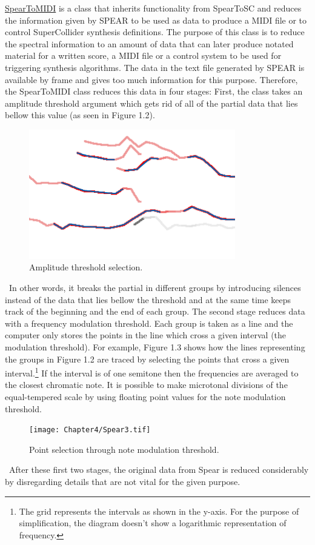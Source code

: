 \href{http://github.com/freuben/FedeLib/blob/master/SpearToSC/SpearToMIDI.sc}{SpearToMIDI} is a class that inherits functionality from SpearToSC and reduces the information given by SPEAR to be used as data to produce a MIDI file or to control SuperCollider synthesis definitions. The purpose of this class is to reduce the spectral information to an amount of data that can later produce notated material for a written score, a MIDI file or a control system to be used for triggering synthesis algorithms. The data in the text file generated by SPEAR is available by frame and gives too much information for this purpose. Therefore, the SpearToMIDI class reduces this data in four stages: First, the class takes an amplitude threshold argument which gets rid of all of the partial data that lies bellow this value (as seen in Figure 1.2).
\begin{figure}[htbp] %
   \centering
   \includegraphics[width=9cm]{Chapter4/Spear2.tif} %
   \caption{Amplitude threshold selection.}
   \label{fig:example}
\end{figure}\
In other words, it breaks the partial in different groups by introducing silences instead of the data that lies bellow the threshold and at the same time keeps track of the beginning and the end of each group. The second stage reduces data with a frequency modulation threshold. Each group is taken as a line and the computer only stores the points in the line which cross a given interval (the modulation threshold). For example, Figure 1.3 shows how the lines representing the groups in Figure 1.2 are traced by selecting the points that cross a given interval.\footnote{The grid represents the intervals as shown in the y-axis. For the purpose of simplification, the diagram doesn't show a logarithmic representation of frequency.} If the interval is of one semitone then the frequencies are averaged to the closest chromatic note. It is possible to make microtonal divisions of the equal-tempered scale by using floating point values for the note modulation threshold.
\begin{figure}[htbp] %
   \centering
   \texttt{[image: Chapter4/Spear3.tif]} %
   \caption{Point selection through note modulation threshold.}
   \label{fig:example}
\end{figure}\
After these first two stages, the original data from Spear is reduced considerably by disregarding details that are not vital for the given purpose. 

